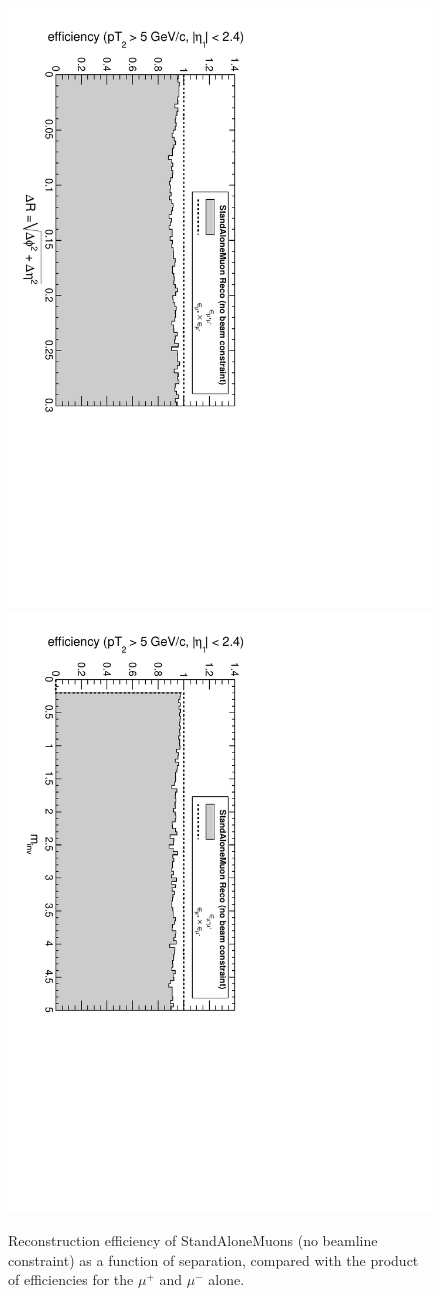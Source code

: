 \documentclass[12pt]{article}
\begin{document}
\begin{figure}[p]
\includegraphics[height=0.5\linewidth, angle=90]{fig/acceptance6_plot/vsdR_StandAloneDefault.pdf}
\includegraphics[height=0.5\linewidth, angle=90]{fig/acceptance6_plot/vsmass_StandAloneDefault.pdf}

\caption{Reconstruction efficiency of StandAloneMuons (no beamline constraint) as a function of
  separation, compared with the product of efficiencies for the
  $\mu^+$ and $\mu^-$ alone. \label{fig:vseverything_StandAloneDefault}}
\end{figure}
\end{document}
